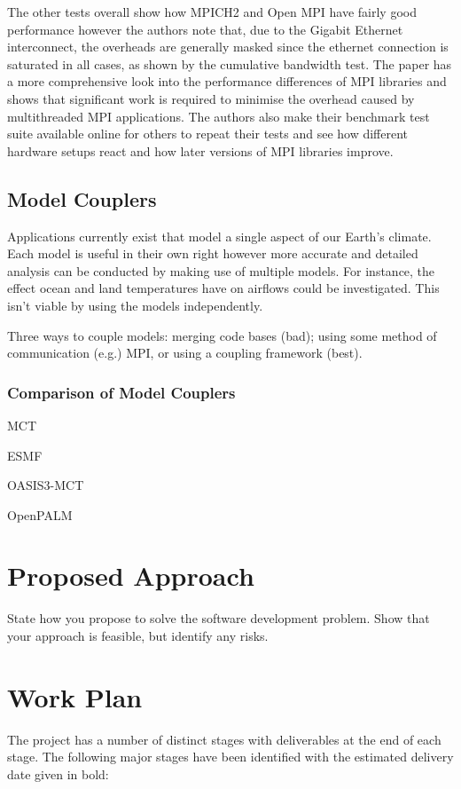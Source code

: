 \documentclass{acm_proc_article-sp}
\renewcommand{\_}{\underscore\hspace{0pt}}
\begin{document}
The other tests overall show how MPICH2 and Open MPI have fairly good
performance however the authors note that, due to the Gigabit Ethernet
interconnect, the overheads are generally masked since the ethernet connection
is saturated in all cases, as shown by the cumulative bandwidth test. The paper
has a more comprehensive look into the performance differences of MPI libraries
and shows that significant work is required to minimise the overhead caused by
multithreaded MPI applications. The authors also make their benchmark test suite
available online for others to repeat their tests and see how different hardware
setups react and how later versions of MPI libraries improve.

\subsection*{Model Couplers}

Applications currently exist that model a single aspect of our Earth's climate.
Each model is useful in their own right however more accurate and detailed
analysis can be conducted by making use of multiple models. For instance, the
effect ocean and land temperatures have on airflows could be investigated. This
isn't viable by using the models independently.

Three ways to couple models: merging code bases (bad); using some method of
communication (e.g.) MPI, or using a coupling framework (best).

\subsubsection*{Comparison of Model Couplers}

MCT

ESMF

OASIS3-MCT

OpenPALM

\section*{Proposed Approach}

State how you propose to solve the software development problem. Show that your
approach is feasible, but identify any risks.

\section*{Work Plan}

The project has a number of distinct stages with deliverables at the end of each
stage. The following major stages have been identified with the estimated
delivery date given in bold:
\end{document}

